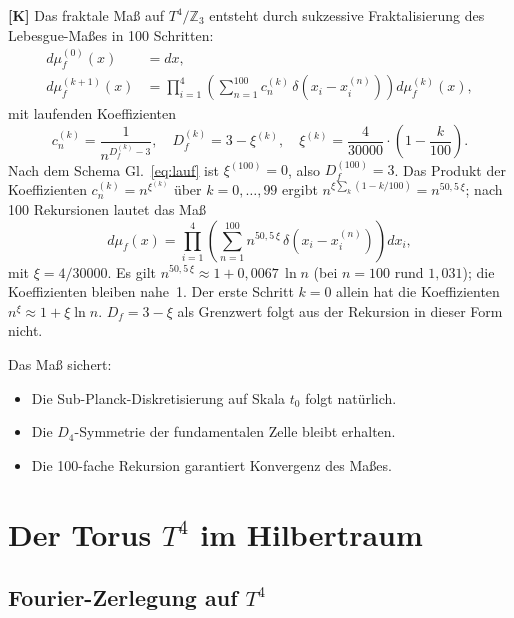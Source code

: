\textbf{[K]} Das fraktale Maß auf $T^4/\mathbb{Z}_3$ entsteht durch
sukzessive Fraktalisierung des Lebesgue-Maßes in 100 Schritten:
\begin{align}
  d\mu_f^{(0)}(x) &= dx,
  \label{eq:mu0} \\
  d\mu_f^{(k+1)}(x) &= \prod_{i=1}^4
  \left( \sum_{n=1}^{100} c_n^{(k)}
  \, \delta\!\left(x_i - x_i^{(n)}\right) \right)
  d\mu_f^{(k)}(x),
  \label{eq:mukp1}
\end{align}
mit laufenden Koeffizienten
\begin{equation}
  c_n^{(k)} = \frac{1}{n^{D_f^{(k)} - 3}},\quad
  D_f^{(k)} = 3 - \xi^{(k)},\quad
  \xi^{(k)} = \frac{4}{30000}\cdot\left(1 - \frac{k}{100}\right).
  \label{eq:lauf}
\end{equation}
Nach dem Schema Gl.~\eqref{eq:lauf} ist $\xi^{(100)} = 0$, also
$D_f^{(100)} = 3$. Das Produkt der Koeffizienten $c_n^{(k)} = n^{\xi^{(k)}}$
über $k = 0,\ldots,99$ ergibt $n^{\xi\sum_k(1-k/100)} = n^{50{,}5\,\xi}$;
nach 100 Rekursionen lautet das Maß
\begin{equation}
  d\mu_f(x)
  = \prod_{i=1}^4
  \left( \sum_{n=1}^{100} n^{50{,}5\,\xi}\,\delta\!\left(x_i-x_i^{(n)}\right)
  \right) dx_i,
  \label{eq:muf}
\end{equation}
mit $\xi = 4/30000$. Es gilt $n^{50{,}5\,\xi} \approx 1 + 0{,}0067\,\ln n$
(bei $n = 100$ rund $1{,}031$); die Koeffizienten bleiben nahe~1.
Der erste Schritt $k = 0$ allein hat die Koeffizienten
$n^\xi \approx 1 + \xi\ln n$. $D_f = 3 - \xi$ als Grenzwert folgt aus der
Rekursion in dieser Form nicht.

Das Maß sichert:
\begin{itemize}
  \item Die Sub-Planck-Diskretisierung auf Skala $t_0$ folgt natürlich.
  \item Die $D_4$-Symmetrie der fundamentalen Zelle bleibt erhalten.
  \item Die 100-fache Rekursion garantiert Konvergenz des Maßes.
\end{itemize}

\section{Der Torus $T^4$ im Hilbertraum}

\subsection{Fourier-Zerlegung auf $T^4$}

